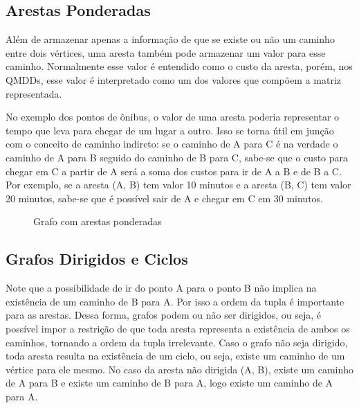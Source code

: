 \subsection{Arestas Ponderadas}
Além de armazenar apenas a informação de que se existe ou não um caminho entre dois vértices, uma aresta também pode armazenar um valor para esse caminho. Normalmente esse valor é entendido como o custo da aresta, porém, nos QMDDs, esse valor é interpretado como um dos valores que compõem a matriz representada.

No exemplo dos pontos de ônibus, o valor de uma aresta poderia representar o tempo que leva para chegar de um lugar a outro. Isso se torna útil em junção com o conceito de caminho indireto: se o caminho de A para C é na verdade o caminho de A para B seguido do caminho de B para C, sabe-se que o custo para chegar em C a partir de A será a soma dos custos para ir de A a B e de B a C. Por exemplo, se a aresta (A, B) tem valor 10 minutos e a aresta (B, C) tem valor 20 minutos, sabe-se que é possível sair de A e chegar em C em 30 minutos.

\begin{figure}[ht]
  \centering
  \caption{Grafo com arestas ponderadas}
  \label{fig:graph3nodeweighted}
\end{figure}


\subsection{Grafos Dirigidos e Ciclos}
Note que a possibilidade de ir do ponto A para o ponto B não implica na existência de um caminho de B para A. Por isso a ordem da tupla é importante para as arestas. Dessa forma, grafos podem ou não ser dirigidos, ou seja, é possível impor a restrição de que toda aresta representa a existência de ambos os caminhos, tornando a ordem da tupla irrelevante. Caso o grafo não seja dirigido, toda aresta resulta na existência de um ciclo, ou seja, existe um caminho de um vértice para ele mesmo. No caso da aresta não dirigida (A, B), existe um caminho de A para B e existe um caminho de B para A, logo existe um caminho de A para A.

